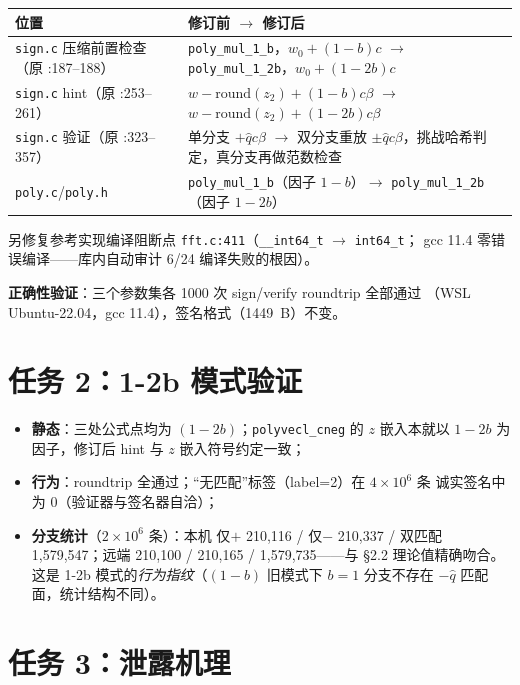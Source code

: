 \documentclass[UTF8,11pt,a4paper]{ctexart}
\newcommand{\code}[1]{\texttt{\small #1}}
\begin{document}
\begin{table}[h]\centering\small
\begin{tabularx}{\textwidth}{@{}lX@{}}
\toprule
位置 & 修订前 $\to$ 修订后 \\
\midrule
\code{sign.c} 压缩前置检查（原 :187--188） &
\code{poly\_mul\_1\_b}，$w_0{+}(1{-}b)c$ $\to$ \code{poly\_mul\_1\_2b}，$w_0{+}(1{-}2b)c$ \\
\code{sign.c} hint（原 :253--261） &
$w-\mathrm{round}(z_2)+(1-b)c\beta$ $\to$ $w-\mathrm{round}(z_2)+(1-2b)c\beta$ \\
\code{sign.c} 验证（原 :323--357） &
单分支 $+\hat q c\beta$ $\to$ 双分支重放 $\pm\hat q c\beta$，挑战哈希判定，真分支再做范数检查 \\
\code{poly.c}/\code{poly.h} & \code{poly\_mul\_1\_b}（因子 $1{-}b$）$\to$ \code{poly\_mul\_1\_2b}（因子 $1{-}2b$） \\
\bottomrule
\end{tabularx}
\end{table}

另修复参考实现编译阻断点 \code{fft.c:411}（\code{\_\_int64\_t} $\to$ \code{int64\_t}；
gcc 11.4 零错误编译——库内自动审计 6/24 编译失败的根因）。

\textbf{正确性验证}：三个参数集各 1000 次 sign/verify roundtrip 全部通过
（WSL Ubuntu-22.04，gcc 11.4），签名格式（1449~B）不变。

\section{任务 2：1-2b 模式验证}

\begin{itemize}
\item \textbf{静态}：三处公式点均为 $(1-2b)$；\code{polyvecl\_cneg} 的 $z$ 嵌入本就以
      $1{-}2b$ 为因子，修订后 hint 与 $z$ 嵌入符号约定一致；
\item \textbf{行为}：roundtrip 全通过；``无匹配''标签（label=2）在 $4\times10^6$ 条
      诚实签名中为 0（验证器与签名器自洽）；
\item \textbf{分支统计}（$2\times10^6$ 条）：本机 仅$+$ 210{,}116 / 仅$-$ 210{,}337 /
      双匹配 1{,}579{,}547；远端 210{,}100 / 210{,}165 / 1{,}579{,}735——与 \S2.2
      理论值精确吻合。这是 1-2b 模式的\emph{行为指纹}（$(1-b)$ 旧模式下 $b{=}1$
      分支不存在 $-\hat q$ 匹配面，统计结构不同）。
\end{itemize}

\section{任务 3：泄露机理}
\end{document}
